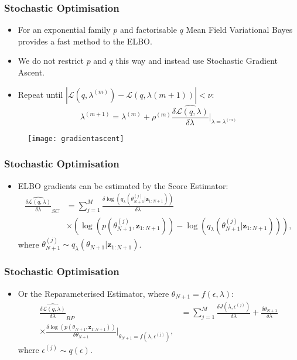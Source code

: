 \documentclass[11pt]{beamer}\usepackage[]{graphicx}\usepackage[]{color}
\begin{document}
\begin{frame}
\frametitle{Stochastic Optimisation}
\begin{itemize}
\item For an exponential family $p$ and factorisable $q$ Mean Field Variational Bayes provides a fast method to the ELBO. 
\item We do not restrict $p$ and $q$ this way and instead use Stochastic Gradient Ascent.
\item Repeat until $| \mathcal{L}(q, \lambda^{(m)}) - \mathcal{L}(q, \lambda{(m+1)})| < \nu$:
\begin{equation}
\label{gradientAscent}
\lambda^{(m+1)} = \lambda^{(m)} + \rho^{(m)} \widehat{\frac{\delta\mathcal{L}(q, \lambda)}{\delta \lambda}} \bigg\rvert_{\lambda = \lambda^{(m)}}
\end{equation}
\end{itemize}
\begin{figure}
\centering
\texttt{[image: gradientascent]}
\end{figure}
\end{frame}

\begin{frame}
\frametitle{Stochastic Optimisation}
\begin{itemize}
\item ELBO gradients can be estimated by the Score Estimator:
\begin{align*}
\widehat{\frac{\delta\mathcal{L}(q, \lambda)}{\delta \lambda}}_{SC} &= \sum_{j = 1}^M \frac{\delta \log(q_{\lambda}(\theta_{N+1}^{(j)} | \textbf{z}_{1:N+1}))}{\delta \lambda}  \\
&\times \left(\log(p(\theta_{N+1}^{(j)}, \textbf{z}_{1:N+1})) - \log(q_{\lambda}(\theta_{N+1}^{(j)} | \textbf{z}_{1:N+1})) \right),
\end{align*}
where $\theta_{N+1}^{(j)} \sim q_{\lambda}(\theta_{N+1} | \textbf{z}_{1:N+1})$.
\end{itemize}
\end{frame}

\begin{frame}
\frametitle{Stochastic Optimisation}
\begin{itemize}
\item Or the Reparameterised Estimator, where $\theta_{N+1} = f(\epsilon, \lambda)$:
\begin{align*}
\widehat{\frac{\delta\mathcal{L}(q, \lambda)}{\delta \lambda}}_{RP} &= \sum_{j = 1}^M \frac{\delta J(\lambda, \epsilon^{(j)})}{\delta \lambda} + \frac{\delta \theta_{N+1}}{\delta \lambda} \\
\times \frac{\delta \log(p(\theta_{N+1}, \textbf{z}_{1:N+1}))}{\delta \theta_{N+1}} \bigg\rvert_{\theta_{N+1} = f(\lambda, \epsilon^{(j)})},
\end{align*}
where $\epsilon^{(j)} \sim q(\epsilon)$.
\end{itemize}
\end{frame}
\end{document}
